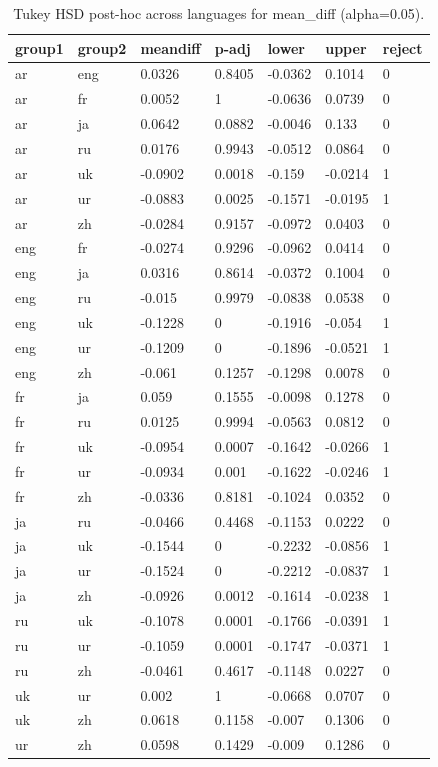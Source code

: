 \begin{table}
\caption{Tukey HSD post-hoc across languages for mean_diff (alpha=0.05).}
\label{tab:tukey_posthoc_lang_mean_diff_2022}
\begin{tabular}{lllllll}
\toprule
group1 & group2 & meandiff & p-adj & lower & upper & reject \\
\midrule
ar & eng & 0.0326 & 0.8405 & -0.0362 & 0.1014 & 0 \\
ar & fr & 0.0052 & 1 & -0.0636 & 0.0739 & 0 \\
ar & ja & 0.0642 & 0.0882 & -0.0046 & 0.133 & 0 \\
ar & ru & 0.0176 & 0.9943 & -0.0512 & 0.0864 & 0 \\
ar & uk & -0.0902 & 0.0018 & -0.159 & -0.0214 & 1 \\
ar & ur & -0.0883 & 0.0025 & -0.1571 & -0.0195 & 1 \\
ar & zh & -0.0284 & 0.9157 & -0.0972 & 0.0403 & 0 \\
eng & fr & -0.0274 & 0.9296 & -0.0962 & 0.0414 & 0 \\
eng & ja & 0.0316 & 0.8614 & -0.0372 & 0.1004 & 0 \\
eng & ru & -0.015 & 0.9979 & -0.0838 & 0.0538 & 0 \\
eng & uk & -0.1228 & 0 & -0.1916 & -0.054 & 1 \\
eng & ur & -0.1209 & 0 & -0.1896 & -0.0521 & 1 \\
eng & zh & -0.061 & 0.1257 & -0.1298 & 0.0078 & 0 \\
fr & ja & 0.059 & 0.1555 & -0.0098 & 0.1278 & 0 \\
fr & ru & 0.0125 & 0.9994 & -0.0563 & 0.0812 & 0 \\
fr & uk & -0.0954 & 0.0007 & -0.1642 & -0.0266 & 1 \\
fr & ur & -0.0934 & 0.001 & -0.1622 & -0.0246 & 1 \\
fr & zh & -0.0336 & 0.8181 & -0.1024 & 0.0352 & 0 \\
ja & ru & -0.0466 & 0.4468 & -0.1153 & 0.0222 & 0 \\
ja & uk & -0.1544 & 0 & -0.2232 & -0.0856 & 1 \\
ja & ur & -0.1524 & 0 & -0.2212 & -0.0837 & 1 \\
ja & zh & -0.0926 & 0.0012 & -0.1614 & -0.0238 & 1 \\
ru & uk & -0.1078 & 0.0001 & -0.1766 & -0.0391 & 1 \\
ru & ur & -0.1059 & 0.0001 & -0.1747 & -0.0371 & 1 \\
ru & zh & -0.0461 & 0.4617 & -0.1148 & 0.0227 & 0 \\
uk & ur & 0.002 & 1 & -0.0668 & 0.0707 & 0 \\
uk & zh & 0.0618 & 0.1158 & -0.007 & 0.1306 & 0 \\
ur & zh & 0.0598 & 0.1429 & -0.009 & 0.1286 & 0 \\
\bottomrule
\end{tabular}
\end{table}
